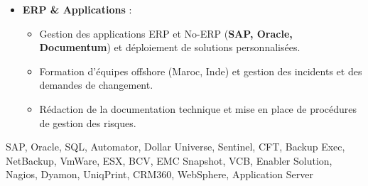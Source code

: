 \begin{experiences}
{\begin{itemize}[left=0pt,label={},itemsep=0.5em]
          \item \textbf{ERP \& Applications} :
            \begin{itemize}[itemsep=0.2em,topsep=0.2em,parsep=0pt]
              \small
              \item Gestion des applications ERP et No-ERP (\textbf{SAP, Oracle, Documentum}) et déploiement de solutions personnalisées.
              \item Formation d'équipes offshore (Maroc, Inde) et gestion des incidents et des demandes de changement.
              \item Rédaction de la documentation technique et mise en place de procédures de gestion des risques.
            \end{itemize}

        \end{itemize}
    }
    {SAP, Oracle, SQL, Automator, Dollar Universe, Sentinel, CFT, Backup Exec, NetBackup, VmWare, ESX, BCV, EMC Snapshot, VCB, Enabler Solution, Nagios, Dyamon, UniqPrint, CRM360, WebSphere, Application Server}

\emptySeparator
\end{experiences}
